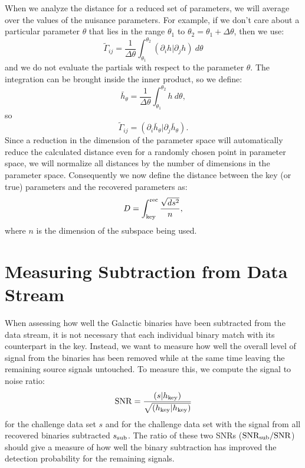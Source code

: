 \documentclass[11pt]{article}
\begin{document}
When we analyze the distance for a reduced set of parameters, we will average over the values of the nuisance parameters. For example, if we don't care about a particular parameter $\theta$ that lies in the range $\theta_1$ to $\theta_2 = \theta_1 + \Delta\theta$, then we use:
\begin{equation}
\tilde{\Gamma}_{ij} = \frac{1}{\Delta\theta}\int_{\theta_1}^{\theta_2}{\left(\partial_ih|\partial_jh\right)~d\theta}
\end{equation}
and we do not evaluate the partials with respect to the parameter $\theta$. The integration can be brought inside the inner product, so we define:
\begin{equation}
\bar{h}_\theta = \frac{1}{\Delta\theta}\int_{\theta_1}^{\theta_2}{h~d\theta},
\end{equation}
so
\begin{equation}
\tilde{\Gamma}_{ij} = \left(\partial_i\bar{h}_{\theta}|\partial_j\bar{h}_{\theta}\right).
\end{equation}
Since a reduction in the dimension of the parameter space will automatically reduce the calculated distance even for a randomly chosen point in parameter space, we will normalize all distances by the number of dimensions in the parameter space. Consequently we now define the distance between the key (or true) parameters and the recovered parameters as:
\begin{equation}
D = \int_{\rm key}^{\rm rec}{\frac{\sqrt{ds^2}}{n}},
\end{equation}
where $n$ is the dimension of the subspace being used.

\section{Measuring Subtraction from Data Stream \label{subtraction}}
When assessing how well the Galactic binaries have been subtracted from the data stream, it is not necessary that each individual binary match with its counterpart in the key. Instead, we want to measure how well the overall level of signal from the binaries has been removed while at the same time leaving the remaining source signals untouched. To measure this, we compute the signal to noise ratio:
\begin{equation}
{\rm SNR} = \frac{\left(s|h_{\rm key}\right)}{\sqrt{\left(h_{\rm key}|h_{\rm key}\right)}}
\end{equation}
for the challenge data set $s$ and for the challenge data set with the signal from all recovered binaries subtracted $s_{\rm sub}$. The ratio of these two SNRs (${\rm SNR}_{\rm sub}/{\rm SNR}$) should give a measure of how well the binary subtraction has improved the detection probability for the remaining signals.
\end{document}
